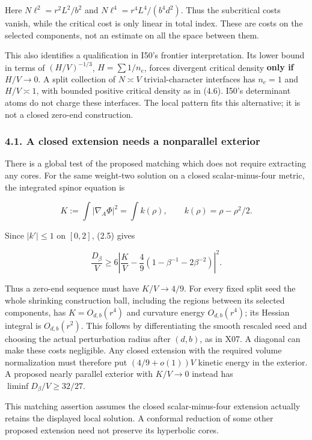 \documentclass[
  11pt,
]{article}
\begin{document}
Here \(N\ell^2=r^2L^2/b^2\) and \(N\ell^4=r^4L^4/(b^4d^2)\). Thus the
subcritical costs vanish, while the critical cost is only linear in
total index. These are costs on the selected components, not an estimate
on all the space between them.

This also identifies a qualification in I50's frontier interpretation.
Its lower bound in terms of \((H/V)^{-1/3}\), \(H=\sum1/n_e\), forces
divergent critical density \textbf{only if \(H/V\to0\)}. A split
collection of \(N\asymp V\) trivial-character interfaces has \(n_e=1\)
and \(H/V\asymp1\), with bounded positive critical density as in (4.6).
I50's determinant atoms do not charge these interfaces. The local
pattern fits this alternative; it is not a closed zero-end construction.

\hypertarget{a-closed-extension-needs-a-nonparallel-exterior}{%
\subsubsection{4.1. A closed extension needs a nonparallel
exterior}\label{a-closed-extension-needs-a-nonparallel-exterior}}

There is a global test of the proposed matching which does not require
extracting any cores. For the same weight-two solution on a closed
scalar-minus-four metric, the integrated spinor equation is

\[
 K:=\int|\nabla_A\Phi|^2=\int k(\rho),\qquad
 k(\rho)=\rho-\rho^2/2.
\]

Since \(|k'|\le1\) on \([0,2]\), (2.5) gives

\[
 \boxed{\frac{D_\beta}{V}\ge
 6\left|\frac KV-\frac49(1-\beta^{-1}-2\beta^{-2})\right|^2.}
 \tag{4.7}
\]

Thus a zero-end sequence must have \(K/V\to4/9\). For every fixed split
seed the whole shrinking construction ball, including the regions
between its selected components, has \(K=O_{d,b}(r^4)\) and curvature
energy \(O_{d,b}(r^4)\); its Hessian integral is \(O_{d,b}(r^2)\). This
follows by differentiating the smooth rescaled seed and choosing the
actual perturbation radius after \((d,b)\), as in X07. A diagonal can
make these costs negligible. Any closed extension with the required
volume normalization must therefore put \((4/9+o(1))V\) kinetic energy
in the exterior. A proposed nearly parallel exterior with \(K/V\to0\)
instead has \(\liminf D_\beta/V\ge32/27\).

This matching assertion assumes the closed scalar-minus-four extension
actually retains the displayed local solution. A conformal reduction of
some other proposed extension need not preserve its hyperbolic cores.
\end{document}
